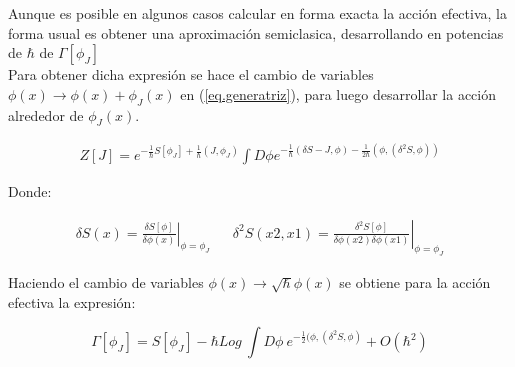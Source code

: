 \begin{comment}
Para demostrar esto se toma su derivada funcional evaluada en el campo medio $\phi _J $.


\begin{equation}
\frac{\delta \Gamma [ \phi _J ]}{\delta \phi _J (x) } = 
J(x) + \int dx ' \frac{\delta J [\phi _J ]}{\delta \phi _J (x) } \phi _J (x) - 
\frac{1}{Z[J]} \int dx' \frac{\delta Z[J] }{\delta J(x')} \frac{\delta J[\phi _J ]}{\delta \phi _J (x)} = J(x) \\[8pt]
\end{equation}
\end{comment}

Aunque es posible en algunos casos calcular en forma exacta la acción efectiva, la forma usual es obtener una aproximación semiclasica, desarrollando en potencias de $\hbar$ de $\Gamma [ \phi _J]$\\


Para obtener dicha expresión se hace el cambio de variables $\phi (x) \rightarrow \phi(x) + \phi _J (x) $ en (\ref{eq.generatriz}), para luego desarrollar la acción alrededor de $\phi _J (x)$.


\begin{equation}
\begin{array}{c}
Z[J] = e ^{- \frac{1}{\hbar} S[ \phi _J ] + \frac{1}{\hbar} (J, \phi _J )} 
\int D \phi e ^{ - \frac{1}{\hbar} (\delta S  - J, \phi ) - \frac{1}{2 \hbar}  (\phi, (\delta ^2 S, \phi ) ) }
\end{array}
\end{equation}

Donde:

\begin{equation}
\begin{array}{ccc}
\delta S(x) = \left. \frac{\delta S[\phi]}{ \delta \phi (x) } \right| _{\phi = \phi _J} & &
\delta ^2 S(x2,x1) = \left. \frac{\delta ^2 S[\phi]}{ \delta \phi (x2) \delta \phi (x1) } \right| _{\phi = \phi _J}
\end{array}
\end{equation}

Haciendo el cambio de variables $\phi (x) \rightarrow \sqrt{\hbar} \phi (x) $ se obtiene para la acción efectiva la expresión:


\begin{equation}
\Gamma [\phi _J ] = S [ \phi _J ] - 
\hbar Log \ 
\int D \phi \ e ^{- \frac{1}{2}  (\phi, (\delta ^2 S, \phi) } + O(\hbar ^2)
\end{equation}


